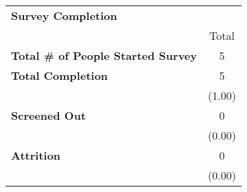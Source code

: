 \begin{tabular}{lc}
\toprule
\textbf{Survey Completion}\\
 & Total \\
\hline
\textbf{Total \# of People Started Survey} & 5 \\
\addlinespace
\textbf{Total Completion} & 5 \\
 & (1.00) \\
\textbf{Screened Out} & 0 \\
 & (0.00) \\
\textbf{Attrition} & 0  \\
 & (0.00) \\
\hline
\end{tabular}
